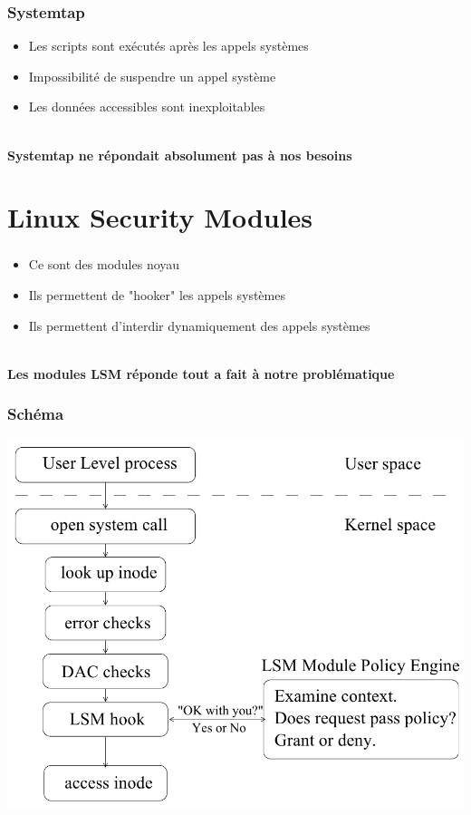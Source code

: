 \documentclass{beamer}
\begin{document}
\begin{frame}
\frametitle{Systemtap}
\begin{itemize}
	\item Les scripts sont exécutés après les appels systèmes
	\item Impossibilité de suspendre un appel système
	\item Les données accessibles sont inexploitables
\end{itemize}
~\\
\textbf{Systemtap ne répondait absolument pas à nos besoins}

\end{frame}

\section{Linux Security Modules}
\begin{frame}
\frametitle{}
	\begin{itemize}
		\item Ce sont des modules noyau
		\item Ils permettent de "hooker" les appels systèmes
		\item Ils permettent d'interdir dynamiquement des appels systèmes
	\end{itemize}
~\\	
\textbf{Les modules LSM réponde tout a fait à notre problématique}
\end{frame}

\begin{frame}
\frametitle{Schéma}
\begin{center}
	\includegraphics[scale=0.30]{lsm1.png}
\end{center}
\end{frame}
\end{document}
